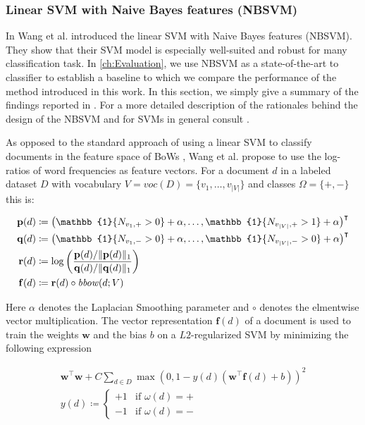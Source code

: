 \subsubsection{Linear SVM with Naive Bayes features (NBSVM)}

\label{sec:nbsvm}

In \cite{wang2012baselines} Wang et al. introduced the linear SVM with Naive
Bayes features (NBSVM). They show that their SVM model is especially well-suited and robust for 
many classification task. In \ref{ch:Evaluation}, we use NBSVM as a state-of-the-art to classifier 
to establish a baseline to which we compare the performance of the method introduced in this work.  
In this section, we simply give a summary of the findings reported in \cite{wang2012baselines}. For a more detailed description
of the rationales behind the design of the NBSVM and for SVMs in general consult
\cite{vapnik2013nature}.

As opposed to the standard approach of using a linear SVM to
classify documents in the feature space of BoWs \cite{mccallum1998comparison}, Wang et al. propose
to use the log-ratios of word frequencies as feature vectors. 
For a document $d$ in a labeled dataset $D$ with vocabulary $V = voc(D) = \{v_1, \ldots, v_{|V|} \}$ and classes
$\Omega = \{+, -\}$ this is:

\begin{equation*}
\begin{split}
\mathbf{p}(d) &\coloneqq \left(\mathbb{1}\{N_{v_1,+} > 0\} + \alpha, \ldots,
\mathbb{1}\{N_{v_{|V|},+} > 1\} + \alpha\right)^\intercal
\\
\mathbf{q}(d) &\coloneqq \left(\mathbb{1}\{N_{v_1,-} >0 \} + \alpha, \ldots,
\mathbb{1}\{N_{v_{|V|},-} > 0\} + \alpha\right)^\intercal \\
\mathbf{r}(d) &\coloneqq \log\left(\frac{\mathbf{p}(d) / \lVert
\mathbf{p}(d)\rVert_1}{\mathbf{q}(d) / \lVert \mathbf{q}(d)\rVert_1}\right) \\
\mathbf{f}(d) &\coloneqq \mathbf{r}(d) \circ \mli{bbow}(d; V)
\end{split}
\end{equation*}

Here $\alpha$ denotes the Laplacian Smoothing parameter and $\circ$ denotes the
elmentwise vector multiplication.  
The vector representation $\mathbf{f}(d)$ of a document is used to train the
weights $\mathbf{w}$ and the bias $b$ on a $L2$-regularized SVM by minimizing the following expression

\begin{equation}
\begin{split}
\mathbf{w}^\intercal\mathbf{w} + C\sum\limits_{d\in D} \max\left(0,
1-y(d)(\mathbf{w}^\intercal\mathbf{f}(d) + b)\right)^2 \\
y(d) \coloneqq \begin{cases} +1 & \text{if~} \omega(d) = + \\ -1 & \text{if~}
\omega(d) = - \end{cases}
\end{split}
\end{equation}

